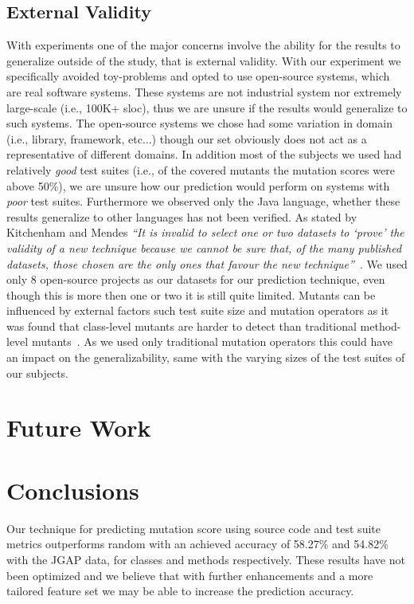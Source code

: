 \subsection{External Validity}
\label{subsec:conclusions_external_validity}
With experiments one of the major concerns involve the ability for the results to generalize outside of the study, that is external validity. With our experiment we specifically avoided toy-problems and opted to use open-source systems, which are real software systems. These systems are not industrial system nor extremely large-scale (i.e., 100K+ \gls{sloc}), thus we are unsure if the results would generalize to such systems. The open-source systems we chose had some variation in domain (i.e., library, framework, etc...) though our set obviously does not act as a representative of different domains. In addition most of the subjects we used had relatively \emph{good} test suites (i.e., of the covered mutants the mutation scores were above 50\%), we are unsure how our prediction would perform on systems with \emph{poor} test suites. Furthermore we observed only the Java language, whether these results generalize to other languages has not been verified. As stated by Kitchenham and Mendes \textit{``It is invalid to select one or two datasets to `prove' the validity of a new technique because we cannot be sure that, of the many published datasets, those chosen are the only ones that favour the new technique''}~\cite{KM09}. We used only 8 open-source projects as our datasets for our prediction technique, even though this is more then one or two it is still quite limited.  Mutants can be influenced by external factors such test suite size and mutation operators as it was found that class-level mutants are harder to detect than traditional method-level mutants~\cite{NK11}. As we used only traditional mutation operators this could have an impact on the generalizability, same with the varying sizes of the test suites of our subjects.


\section{Future Work}
\label{sec:conclusions_future_work}


\section{Conclusions}
\label{sec:conclusions_conclusions}
Our technique for predicting mutation score using source code and test suite metrics outperforms random with an achieved accuracy of 58.27\% and 54.82\% with the JGAP data, for classes and methods respectively. These results have not been optimized and we believe that with further enhancements and a more tailored feature set we may be able to increase the prediction accuracy.

